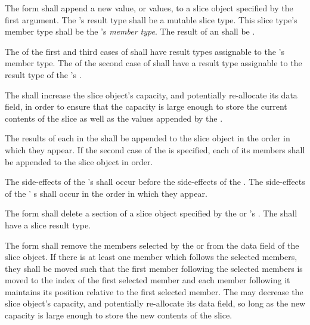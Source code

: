 \specsubsubitem
The  form shall append a new value, or values, to a slice
object specified by the first argument. The 's result
type shall be a mutable slice type. This slice type's member type shall be the
's \textit{member type}. The result of an 
shall be .

\specsubsubitem
The  of the first and third cases of
 shall have result types assignable to the
's member type. The  of the second case
of  shall have a result type assignable to the result
type of the 's .

\specsubsubitem
The  shall increase the slice object's capacity, and
potentially re-allocate its data field, in order to ensure that the capacity is
large enough to store the current contents of the slice as well as the values
appended by the .

\specsubsubitem
The results of each  in the 
shall be appended to the slice object in the order in which they appear. If the
second case of the  is specified, each of its members
shall be appended to the slice object in order.

\specsubsubitem
The side-effects of the 's  shall occur
before the side-effects of the . The
side-effects of the ' s shall
occur in the order in which they appear.

\specsubsubitem
The  form shall delete a section of a slice object specified by
the  or 's
. The  shall
have a slice result type.

\specsubsubitem
The  form shall remove the members selected by the
 or  from the
data field of the slice object. If there is at least one member which follows
the selected members, they shall be moved such that the first member following
the selected members is moved to the index of the first selected member and each
member following it maintains its position relative to the first selected
member. The  may decrease the slice object's capacity, and
potentially re-allocate its data field, so long as the new capacity is large
enough to store the new contents of the slice.

